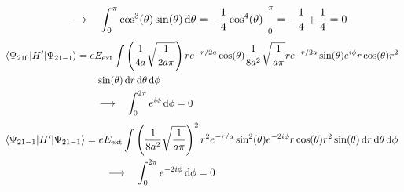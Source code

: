 \documentclass[11pt]{article}
\begin{document}
\begin{enumerate}[label=\alph*)]
\begin{align*}
& \qquad \longrightarrow \quad  \int_0^\pi \cos[3](\theta)\sin(\theta)\dd{\theta} = -\frac{1}{4}\cos[4](\theta)\eval_0^\pi = -\frac{1}{4}+\frac{1}{4} = 0
\end{align*}
\begin{align*}
\mel{\Psi_{210}}{H^\prime}{\Psi_{21-1}} & = eE_{\text{ext}}\int \left(\frac{1}{4a}\sqrt{\frac{1}{2a\pi}}\right)re^{-r/2a}\cos(\theta)\frac{1}{8a^2}\sqrt{\frac{1}{a\pi}}re^{-r/2a}\sin(\theta)e^{i\phi}r\cos(\theta)r^2\\
& \qquad \sin(\theta)\dd{r}\dd{\theta}\dd{\phi}\\
& \qquad \longrightarrow \quad  \int_0^{2\pi} e^{i\phi}\dd{\phi} = 0
\end{align*}
\begin{align*}
\mel{\Psi_{21-1}}{H^\prime}{\Psi_{21-1}} & = eE_{\text{ext}}\int \left(\frac{1}{8a^2}\sqrt{\frac{1}{a\pi}}\right)^2r^2e^{-r/a}\sin[2](\theta)e^{-2i\phi}r\cos(\theta)r^2\sin(\theta)\dd{r}\dd{\theta}\dd{\phi}\\
& \qquad \longrightarrow \quad  \int_0^{2\pi} e^{-2i\phi}\dd{\phi} = 0
\end{align*}


\end{enumerate}
\end{document}
